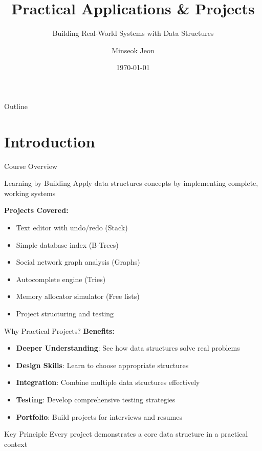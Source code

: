 \documentclass[aspectratio=169,xcolor=dvipsnames]{beamer}
\title{Practical Applications \& Projects}
\subtitle{Building Real-World Systems with Data Structures}
\author{Minseok Jeon}
\institute{DGIST}
\date{\today}
\begin{document}
\begin{frame}
  \titlepage
\end{frame}

\begin{frame}{Outline}
  \tableofcontents
\end{frame}

\section{Introduction}

\begin{frame}{Course Overview}
  \begin{block}{Learning by Building}
    Apply data structures concepts by implementing complete, working systems
  \end{block}

  \vspace{0.3cm}
  \textbf{Projects Covered:}
  \begin{itemize}
    \item Text editor with undo/redo (Stack)
    \item Simple database index (B-Trees)
    \item Social network graph analysis (Graphs)
    \item Autocomplete engine (Tries)
    \item Memory allocator simulator (Free lists)
    \item Project structuring and testing
  \end{itemize}
\end{frame}

\begin{frame}{Why Practical Projects?}
  \textbf{Benefits:}
  \begin{itemize}
    \item \textbf{Deeper Understanding}: See how data structures solve real problems
    \item \textbf{Design Skills}: Learn to choose appropriate structures
    \item \textbf{Integration}: Combine multiple data structures effectively
    \item \textbf{Testing}: Develop comprehensive testing strategies
    \item \textbf{Portfolio}: Build projects for interviews and resumes
  \end{itemize}

  \vspace{0.3cm}
  \begin{alertblock}{Key Principle}
    Every project demonstrates a core data structure in a practical context
  \end{alertblock}
\end{frame}
\end{document}
